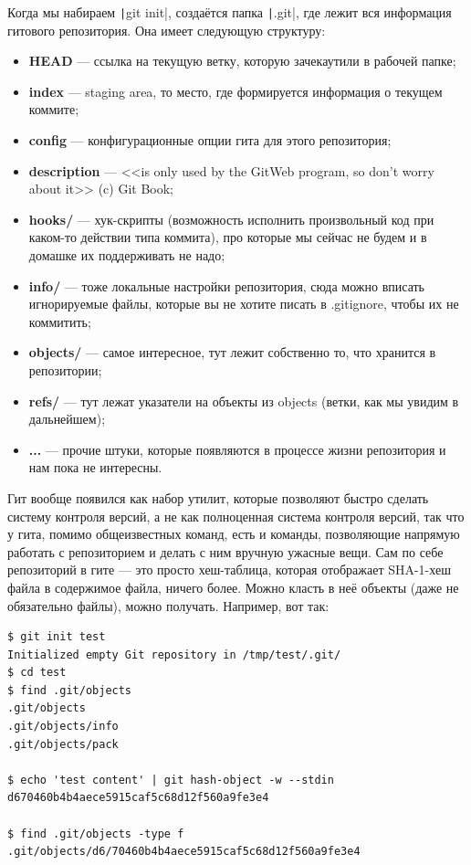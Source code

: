 \documentclass[a5paper]{article}
\begin{document}
Когда мы набираем \texttt|git init|, создаётся папка \texttt|.git|, где лежит вся информация гитового репозитория. Она имеет следующую структуру:

\begin{itemize}
	\item \textbf{HEAD} --- ссылка на текущую ветку, которую зачекаутили в рабочей папке;
	\item \textbf{index} --- staging area, то место, где формируется информация о текущем коммите;
	\item \textbf{config} --- конфигурационные опции гита для этого репозитория;
	\item \textbf{description} --- <<is only used by the GitWeb program, so don’t worry about it>> (c) Git Book;
	\item \textbf{hooks/} --- хук-скрипты (возможность исполнить произвольный код при каком-то действии типа коммита), про которые мы сейчас не будем и в домашке их поддерживать не надо;
	\item \textbf{info/} --- тоже локальные настройки репозитория, сюда можно вписать игнорируемые файлы, которые вы не хотите писать в .gitignore, чтобы их не коммитить;
	\item \textbf{objects/} --- самое интересное, тут лежит собственно то, что хранится в репозитории;
	\item \textbf{refs/} --- тут лежат указатели на объекты из objects (ветки, как мы увидим в дальнейшем);
	\item \textbf{...} --- прочие штуки, которые появляются в процессе жизни репозитория и нам пока не интересны.
\end{itemize}

Гит вообще появился как набор утилит, которые позволяют быстро сделать систему контроля версий, а не как полноценная система контроля версий, так что у гита, помимо общеизвестных команд, есть и команды, позволяющие напрямую работать с репозиторием и делать с ним вручную ужасные вещи. Сам по себе репозиторий в гите --- это просто хеш-таблица, которая отображает SHA-1-хеш файла в содержимое файла, ничего более. Можно класть в неё объекты (даже не обязательно файлы), можно получать. Например, вот так:

\begin{verbatim}
$ git init test
Initialized empty Git repository in /tmp/test/.git/
$ cd test
$ find .git/objects
.git/objects
.git/objects/info
.git/objects/pack

$ echo 'test content' | git hash-object -w --stdin
d670460b4b4aece5915caf5c68d12f560a9fe3e4

$ find .git/objects -type f
.git/objects/d6/70460b4b4aece5915caf5c68d12f560a9fe3e4
\end{verbatim}
\end{document}
